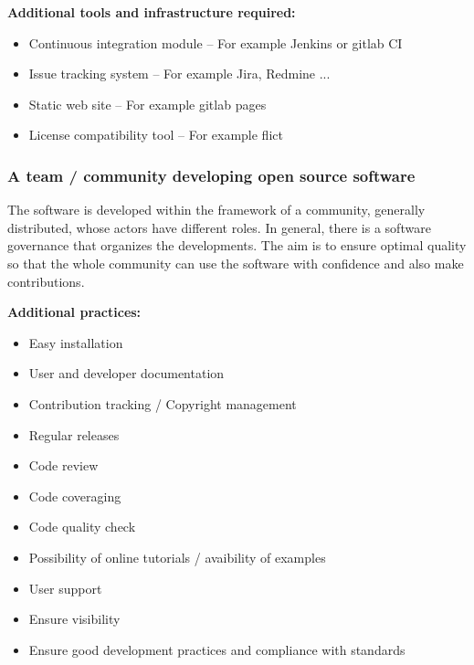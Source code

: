 {\bf Additional tools and infrastructure required:}
\begin{itemize}
\item Continuous integration module – For example Jenkins or gitlab CI
\item Issue tracking system – For example Jira, Redmine ...
\item Static web site – For example gitlab pages 
\item License compatibility tool – For example flict
\end{itemize}


\subsubsection{A team / community developing open source software}

The software is developed within the framework of a community,
generally distributed, whose actors have different roles. In general,
there is a software governance that organizes the developments. The
aim is to ensure optimal quality so that the whole community can use
the software with confidence and also make contributions.

{\bf Additional practices:}
\begin{itemize}
\item Easy installation
\item User and developer documentation
\item Contribution tracking / Copyright management
\item Regular releases
\item Code review
\item Code coveraging
\item Code quality check
\item Possibility of online tutorials / avaibility of examples
\item User support
\item Ensure visibility
\item Ensure good development practices and compliance with standards
\end{itemize}

